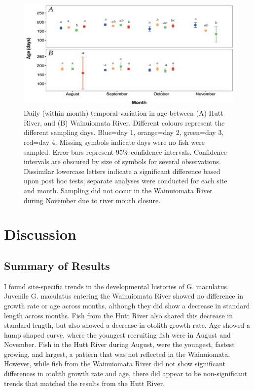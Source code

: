 \documentclass[]{book}
\begin{document}
\begin{figure}
\centering
\includegraphics{images/spatiotemp3.png}
\caption{\label{fig:spatiotemp3}Daily (within month) temporal variation in
age between (A) Hutt River, and (B) Wainuiomata River. Different colours
represent the different sampling days. Blue=day 1, orange=day 2,
green=day 3, red=day 4. Missing symbols indicate days were no fish were
sampled. Error bars represent 95\% confidence intervals. Confidence
intervals are obscured by size of symbols for several observations.
Dissimilar lowercase letters indicate a significant difference based
upon post hoc tests; separate analyses were conducted for each site and
month. Sampling did not occur in the Wainuiomata River during November
due to river mouth closure.}
\end{figure}

\section{Discussion}\label{discussion}

\subsection{Summary of Results}\label{summary-of-results}

I found site-specific trends in the developmental histories of G.
maculatus. Juvenile G. maculatus entering the Wainuiomata River showed
no difference in growth rate or age across months, although they did
show a decrease in standard length across months. Fish from the Hutt
River also shared this decrease in standard length, but also showed a
decrease in otolith growth rate. Age showed a hump shaped curve, where
the youngest recruiting fish were in August and November. Fish in the
Hutt River during August, were the youngest, fastest growing, and
largest, a pattern that was not reflected in the Wainuiomata. However,
while fish from the Wainuiomata River did not show significant
differences in otolith growth rate and age, there did appear to be
non-significant trends that matched the results from the Hutt River.
\end{document}
